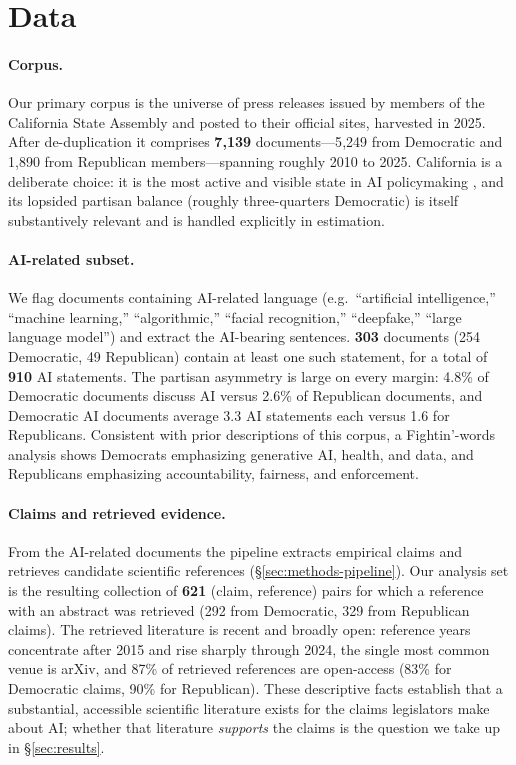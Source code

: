 \section{Data}
\label{sec:data}

\paragraph{Corpus.} Our primary corpus is the universe of press releases issued by members of the
California State Assembly and posted to their official sites, harvested in 2025. After
de-duplication it comprises \textbf{7{,}139} documents---5{,}249 from Democratic and 1{,}890 from
Republican members---spanning roughly 2010 to 2025. California is a deliberate choice: it is the
most active and visible state in AI policymaking \citep{ncsl2024ai}, and its lopsided partisan
balance (roughly three-quarters Democratic) is itself substantively relevant and is handled
explicitly in estimation.

\paragraph{AI-related subset.} We flag documents containing AI-related language (e.g.\ ``artificial
intelligence,'' ``machine learning,'' ``algorithmic,'' ``facial recognition,'' ``deepfake,'' ``large
language model'') and extract the AI-bearing sentences. \textbf{303} documents (254 Democratic, 49
Republican) contain at least one such statement, for a total of \textbf{910} AI statements. The
partisan asymmetry is large on every margin: 4.8\% of Democratic documents discuss AI versus 2.6\%
of Republican documents, and Democratic AI documents average 3.3 AI statements each versus 1.6 for
Republicans. Consistent with prior descriptions of this corpus, a Fightin'-words analysis
\citep{monroe2008fightin} shows Democrats emphasizing generative AI, health, and data, and
Republicans emphasizing accountability, fairness, and enforcement.

\paragraph{Claims and retrieved evidence.} From the AI-related documents the pipeline extracts
empirical claims and retrieves candidate scientific references (\S\ref{sec:methods-pipeline}). Our
analysis set is the resulting collection of \textbf{621} (claim, reference) pairs for which a
reference with an abstract was retrieved (292 from Democratic, 329 from Republican claims). The
retrieved literature is recent and broadly open: reference years concentrate after 2015 and rise
sharply through 2024, the single most common venue is arXiv, and 87\% of retrieved references are
open-access (83\% for Democratic claims, 90\% for Republican). These descriptive facts establish
that a substantial, accessible scientific literature exists for the claims legislators make about
AI; whether that literature \emph{supports} the claims is the question we take up in
\S\ref{sec:results}.

